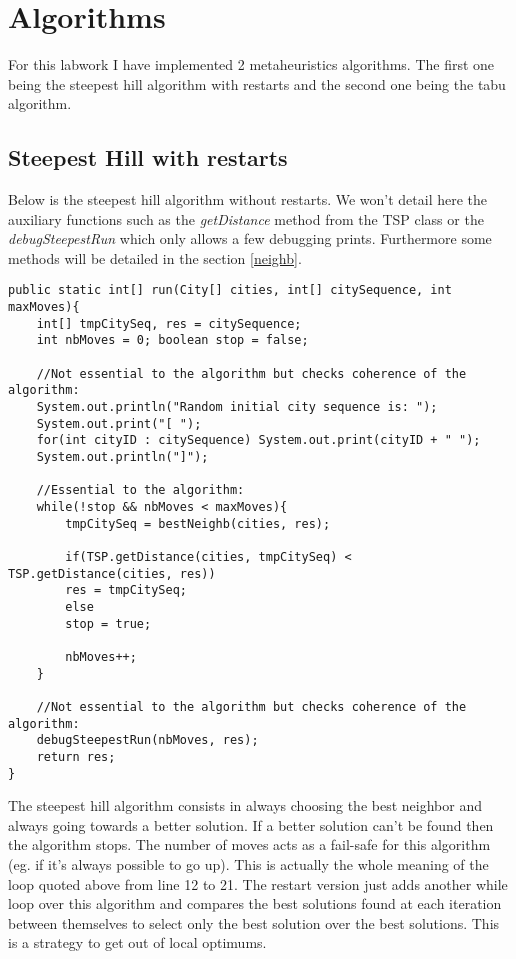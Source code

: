 \documentclass[./standalone.tex]{subfiles}
\begin{document}
	
	\section{Algorithms}
	For this labwork I have implemented 2 metaheuristics algorithms. The first one being the steepest hill algorithm with restarts and the second one being the tabu algorithm. \\
	
	\subsection{Steepest Hill with restarts}

Below is the steepest hill algorithm without restarts. We won't detail here the auxiliary functions such as the \textit{getDistance} method from the TSP class or the \textit{debugSteepestRun} which only allows a few debugging prints. Furthermore some methods will be detailed in the section \ref{neighb}. 
	\begin{lstlisting}[style=Java, caption={Source code of the steepest hill algorithm without restarts}]
public static int[] run(City[] cities, int[] citySequence, int maxMoves){
	int[] tmpCitySeq, res = citySequence;
	int nbMoves = 0; boolean stop = false;
	
	//Not essential to the algorithm but checks coherence of the algorithm:
	System.out.println("Random initial city sequence is: ");
	System.out.print("[ ");
	for(int cityID : citySequence) System.out.print(cityID + " ");
	System.out.println("]");
	
	//Essential to the algorithm:
	while(!stop && nbMoves < maxMoves){
		tmpCitySeq = bestNeighb(cities, res);
		
		if(TSP.getDistance(cities, tmpCitySeq) < TSP.getDistance(cities, res))
		res = tmpCitySeq;
		else
		stop = true;
		
		nbMoves++;
	}
	
	//Not essential to the algorithm but checks coherence of the algorithm:
	debugSteepestRun(nbMoves, res);
	return res;
}
	\end{lstlisting}
The steepest hill algorithm consists in always choosing the best neighbor and always going towards a better solution. If a better solution can't be found then the algorithm stops. The number of moves acts as a fail-safe for this algorithm (eg. if it's always possible to go up). This is actually the whole meaning of the loop quoted above from line 12 to 21. The restart version just adds another while loop over this algorithm and compares the best solutions found at each iteration between themselves to select only the best solution over the best solutions. This is a strategy to get out of local optimums.
\end{document}
